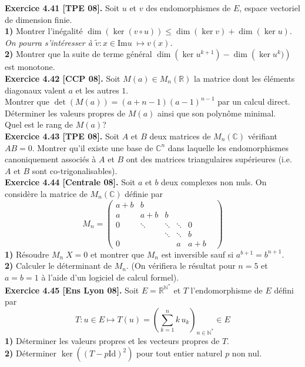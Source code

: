 \documentclass[a4paper,12pt,francais]{article}
\newcommand{\field}[1]{\mathbb{#1}}
\newcommand{\N}{\field{N}}
\newcommand{\R}{\field{R}}
\newcommand{\C}{\field{C}}
\newcommand{\id}{\mbox{Id}}
\newcommand{\im}{\mbox{Im}}
\begin{document}
\noindent
{\bf Exercice 4.41 [TPE 08].} Soit $u$ et $v$ des endomorphismes de $E$, espace vectoriel de dimension finie.\\
{\bf 1)} Montrer l'inégalité
$\displaystyle  \dim ({ \ker (v \circ u) }) \leqslant \dim ({ \ker v })+\dim ({ \ker u })$.\\
{\it On pourra s'intéresser à $\tilde{v} : x\in \im u \; \mapsto v(x)$.}\\
{\bf 2)} Montrer que la suite de terme général $\dim ({ \ker u^{k+1} })-\dim ({ \ker u^k) })$ est monotone.\\

\noindent
{\bf Exercice 4.42 [CCP 08].} Soit $M(a) \in M_n(\R)$ la matrice dont les éléments diagonaux valent $a$ et les autres $1$.\\
 Montrer que $\det(M(a))=(a+n-1)(a-1)^{n-1}$ par un calcul direct.\\
 Déterminer les valeurs propres de $M(a)$ ainsi que son polynôme minimal.\\
 Quel est le rang de $M(a)$?\\

\noindent
{\bf Exercice 4.43 [TPE 08].} Soit $A$ et $B$ deux matrices de $M_n(\C)$ vérifiant $AB=0$. Montrer qu'il existe une base de $\C^n$ dans laquelle les endomorphismes canoniquement associés à $A$ et $B$ ont des matrices triangulaires supérieures (i.e. $A$ et $B$ sont co-trigonalisables).\\

\noindent
{\bf Exercice 4.44 [Centrale 08].} Soit $a$ et $b$ deux complexes non nuls. On considère la matrice de $M_n(\C)$ définie par 
$$  M_n= \left({
\begin{array}{cccccc}
a+b & b      &        &        &   & \\
a   & a+b    & b      &        &   &\\
0   & \ddots & \ddots & \ddots &  0\\
    &        & \ddots & \ddots &  b \\
0   &        &        & a      & a+b
\end{array}
}\right)$$
{\bf 1)} Résoudre $M_n\; X =0$ et montrer que $M_n$ est inversible sauf si $a^{b+1}=b^{n+1}$.\\
{\bf 2)} Calculer le déterminant de $M_n$. (On vérifiera le résultat pour $n=5$ et $a=b=1$ à l'aide d'un logiciel de calcul formel).\\

\noindent
{\bf Exercice 4.45 [Ens Lyon 08].} Soit $E=\R^{\N^*}$ et $T$ l'endomorphisme de $E$ défini par 
$$T : u \in E \mapsto T(u) =\left({ \sum_{k=1}^n k\, u_k   }\right)_{n \in \N^*} \in E$$
\indent
{\bf 1)} Déterminer les valeurs propres et les vecteurs propres de $T$.\\
\indent
{\bf 2)} Déterminer $\ker((T-p\id)^2)$ pour tout entier naturel $p$ non nul.\\
\end{document}

